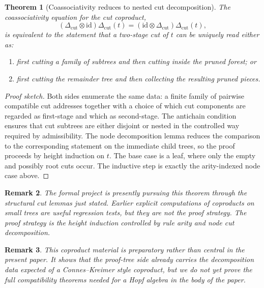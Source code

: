 \documentclass[11pt]{article}
\newtheorem{theorem}{Theorem}
\newtheorem{remark}[theorem]{Remark}
\begin{document}
\begin{theorem}[Coassociativity reduces to nested cut decomposition]
The coassociativity equation for the cut coproduct,
\[
(\Delta_{\mathrm{cut}}\otimes \mathrm{id})\Delta_{\mathrm{cut}}(t)
=
(\mathrm{id}\otimes \Delta_{\mathrm{cut}})\Delta_{\mathrm{cut}}(t),
\]
is equivalent to the statement that a two-stage cut of \(t\) can be uniquely
read either as:
\begin{enumerate}[label=\textup{(\roman*)}]
\item first cutting a family of subtrees and then cutting inside the pruned
forest; or
\item first cutting the remainder tree and then collecting the resulting
pruned pieces.
\end{enumerate}
\end{theorem}

\begin{proof}[Proof sketch]
Both sides enumerate the same data: a finite family of pairwise compatible cut
addresses together with a choice of which cut components are regarded as
first-stage and which as second-stage. The antichain condition ensures that
cut subtrees are either disjoint or nested in the controlled way required by
admissibility. The node decomposition lemma reduces the comparison to the
corresponding statement on the immediate child trees, so the proof proceeds by
height induction on \(t\). The base case is a leaf, where only the empty and
possibly root cuts occur. The inductive step is exactly the arity-indexed
node case above.
\end{proof}

\begin{remark}
The formal project is presently pursuing this theorem through the structural
cut lemmas just stated. Earlier explicit computations of coproducts on small
trees are useful regression tests, but they are not the proof strategy. The
proof strategy is the height induction controlled by rule arity and node cut
decomposition.
\end{remark}

\begin{remark}
This coproduct material is preparatory rather than central in the present
paper. It shows that the proof-tree side already carries the decomposition data
expected of a Connes--Kreimer style coproduct, but we do not yet prove the
full compatibility theorems needed for a Hopf algebra in the body of the
paper.
\end{remark}
\end{document}
